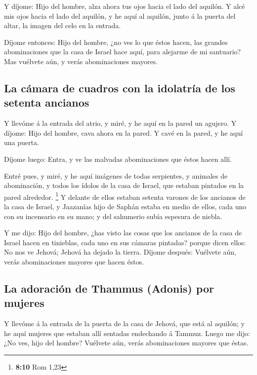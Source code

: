  Y díjome: Hijo del hombre, alza ahora tus ojos hacia el
lado del aquilón. Y alcé mis ojos hacia el lado del aquilón, y he aquí
al aquilón, junto á la puerta del altar, la imagen del celo en la
entrada.

 Díjome entonces: Hijo del hombre, ¿no ves lo que éstos
hacen, las grandes abominaciones que la casa de Israel hace aquí, para
alejarme de mi santuario? Mas vuélvete aún, y verás abominaciones
mayores.

\hypertarget{la-cuxe1mara-de-cuadros-con-la-idolatruxeda-de-los-setenta-ancianos}{%
\subsection{La cámara de cuadros con la idolatría de los setenta
ancianos}\label{la-cuxe1mara-de-cuadros-con-la-idolatruxeda-de-los-setenta-ancianos}}

 Y llevóme á la entrada del atrio, y miré, y he aquí en la
pared un agujero.  Y díjome: Hijo del hombre, cava ahora en
la pared. Y cavé en la pared, y he aquí una puerta.

 Díjome luego: Entra, y ve las malvadas abominaciones que
éstos hacen allí.

 Entré pues, y miré, y he aquí imágenes de todas
serpientes, y animales de abominación, y todos los ídolos de la casa de
Israel, que estaban pintados en la pared alrededor. \footnote{\textbf{8:10}
  Rom 1,23}  Y delante de ellos estaban setenta varones de
los ancianos de la casa de Israel, y Jaazanías hijo de Saphán estaba en
medio de ellos, cada uno con su incensario en su mano; y del sahumerio
subía espesura de niebla.

 Y me dijo: Hijo del hombre, ¿has visto las cosas que los
ancianos de la casa de Israel hacen en tinieblas, cada uno en sus
cámaras pintadas? porque dicen ellos: No nos ve Jehová; Jehová ha dejado
la tierra.  Díjome después: Vuélvete aún, verás
abominaciones mayores que hacen éstos.

\hypertarget{la-adoraciuxf3n-de-thammus-adonis-por-mujeres}{%
\subsection{La adoración de Thammus (Adonis) por
mujeres}\label{la-adoraciuxf3n-de-thammus-adonis-por-mujeres}}

 Y llevóme á la entrada de la puerta de la casa de Jehová,
que está al aquilón; y he aquí mujeres que estaban allí sentadas
endechando á Tammuz.  Luego me dijo: ¿No ves, hijo del
hombre? Vuélvete aún, verás abominaciones mayores que éstas.

